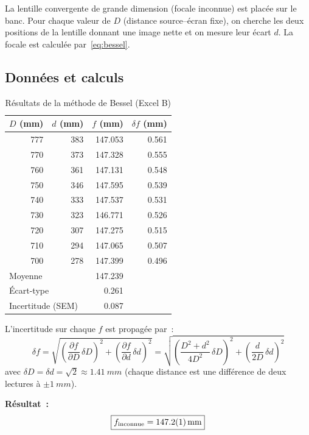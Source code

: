 ﻿\documentclass[a4paper, 11pt]{article}
\begin{document}
La lentille convergente de grande dimension (focale inconnue) est placée sur le banc. Pour chaque valeur de $D$ (distance source–écran fixe), on cherche les deux positions de la lentille donnant une image nette et on mesure leur écart $d$. La focale est calculée par~\eqref{eq:bessel}.

\subsection{Données et calculs}

\begin{table}[H]
\centering
\caption{Résultats de la méthode de Bessel (Excel B)}
\label{tab:1b_results}
\begin{tabular}{rrrr}
\toprule
$D$ (mm) & $d$ (mm) & $f$ (mm) & $\delta f$ (mm) \\
\midrule
777 & 383 & 147.053 & 0.561 \\
770 & 373 & 147.328 & 0.555 \\
760 & 361 & 147.131 & 0.548 \\
750 & 346 & 147.595 & 0.539 \\
740 & 333 & 147.537 & 0.531 \\
730 & 323 & 146.771 & 0.526 \\
720 & 307 & 147.275 & 0.515 \\
710 & 294 & 147.065 & 0.507 \\
700 & 278 & 147.399 & 0.496 \\
\midrule
\multicolumn{2}{l}{Moyenne} & 147.239 & \\
\multicolumn{2}{l}{Écart-type} & 0.261  & \\
\multicolumn{2}{l}{Incertitude (SEM)} & 0.087 & \\
\bottomrule
\end{tabular}
\end{table}

L'incertitude sur chaque $f$ est propagée par~:
\begin{equation}
  \delta f = \sqrt{\left(\frac{\partial f}{\partial D}\,\delta D\right)^2 + \left(\frac{\partial f}{\partial d}\,\delta d\right)^2}
  = \sqrt{\left(\frac{D^2+d^2}{4D^2}\,\delta D\right)^2 + \left(\frac{d}{2D}\,\delta d\right)^2}
\end{equation}
avec $\delta D = \delta d = \sqrt{2} \approx \SI{1.41}{mm}$ (chaque distance est une différence de deux lectures à $\pm\SI{1}{mm}$).

\textbf{Résultat~:}
\begin{equation}
  \boxed{f_\text{inconnue} = \SI{147.2 \pm 0.1}{mm}}
\end{equation}
\end{document}
